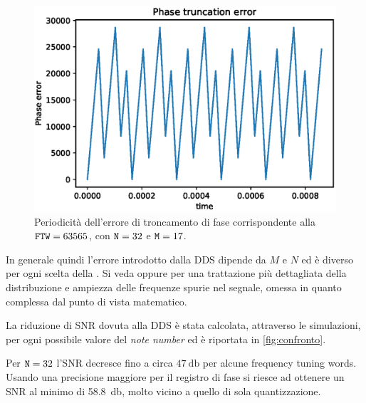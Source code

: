\begin{figure}[H]
	\centering
	\includegraphics[width=0.85\columnwidth]{TeX_files/phase_truncation_error.eps}
	\caption{Periodicità dell'errore di troncamento di fase corrispondente alla $\texttt{FTW}=63565$, con $\texttt{N}=32$ e $\texttt{M}=17$.}
\end{figure}

In generale quindi l'errore introdotto dalla DDS dipende da $M$ e $N$ ed è diverso per ogni
scelta della . Si veda \cite{analogdevicessec4} oppure \cite{exactspurs} per una trattazione
più dettagliata della distribuzione e ampiezza delle frequenze spurie nel segnale,
omessa in quanto complessa dal punto di vista matematico.

La riduzione di SNR dovuta alla DDS è stata calcolata, attraverso le simulazioni,
per ogni possibile valore del \textit{note number} ed è riportata in \cref{fig:confronto}.

Per $\texttt{N}=32$ l'SNR decresce fino a circa $\SI{47}{\decibel}$ per alcune
frequency tuning words. Usando una precisione maggiore per il registro di fase
si riesce ad ottenere un SNR al minimo di \SI{58.8}{\decibel}, molto vicino a quello di sola quantizzazione.


